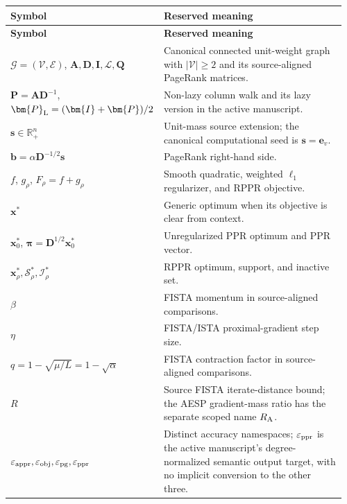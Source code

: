 
\begin{longtable}{@{}>{\raggedright\arraybackslash}p{0.36\linewidth}>{\raggedright\arraybackslash}p{0.60\linewidth}@{}}
\toprule
\textbf{Symbol} & \textbf{Reserved meaning} \\
\midrule
\endfirsthead
\toprule
\textbf{Symbol} & \textbf{Reserved meaning} \\
\midrule
\endhead
\bottomrule
\endfoot
$\mathcal{G}=(\mathcal{V},\mathcal{E})$, $\bm{A},\bm{D},\bm{I},\bm{\mathcal L},\bm{Q}$ & Canonical connected unit-weight graph with $|\mathcal{V}|\geq2$ and its source-aligned PageRank matrices. \\
$\bm{P}=\bm{A}\bm{D}^{-1}$, $\bm{P}_{\rm L}=(\bm{I}+\bm{P})/2$ & Non-lazy column walk and its lazy version in the active manuscript. \\
$\bm{s}\in\mathbb R_+^n$ & Unit-mass source extension; the canonical computational seed is $\bm{s}=\bm{e}_v$. \\
$\bm{b}=\alpha\bm{D}^{-1/2}\bm{s}$ & PageRank right-hand side. \\
$f$, $g_\rho$, $F_\rho=f+g_\rho$ & Smooth quadratic, weighted $\ell_1$ regularizer, and RPPR objective. \\
$\bm{x}^*$ & Generic optimum when its objective is clear from context. \\
$\bm{x}_0^*$, $\bm{\pi}=\bm{D}^{1/2}\bm{x}_0^*$ & Unregularized PPR optimum and PPR vector. \\
$\bm{x}_\rho^*,\mathcal{S}_\rho^*,\mathcal{I}_\rho^*$ & RPPR optimum, support, and inactive set. \\
$\beta$ & FISTA momentum in source-aligned comparisons. \\
$\eta$ & FISTA/ISTA proximal-gradient step size. \\
$q=1-\sqrt{\mu/L}=1-\sqrt{\alpha}$ & FISTA contraction factor in source-aligned comparisons. \\
$R$ & Source FISTA iterate-distance bound; the AESP gradient-mass ratio has the separate scoped name $R_{\rm A}$. \\
$\varepsilon_{\rm appr},\varepsilon_{\rm obj},\varepsilon_{\rm pg},\varepsilon_{\rm ppr}$ & Distinct accuracy namespaces; $\varepsilon_{\rm ppr}$ is the active manuscript's degree-normalized semantic output target, with no implicit conversion to the other three. \\
\end{longtable}

\ifnotationscoped

